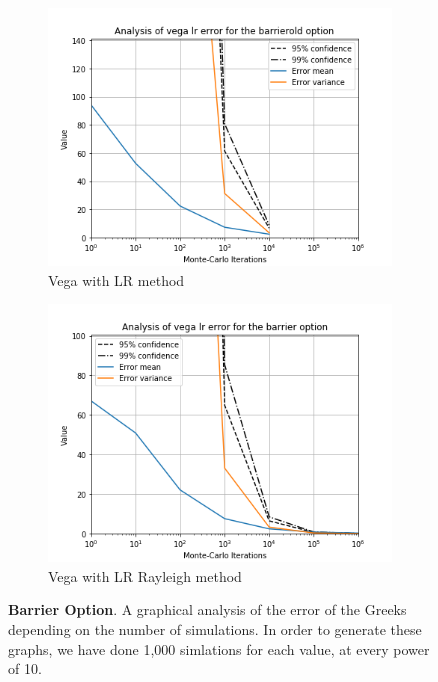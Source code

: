 \documentclass[11pt,a4paper,fleqn]{article}
\begin{document}
\begin{figure}[h!]
      \begin{subfigure}[b]{0.45\textwidth}
          \includegraphics[width=\textwidth]{graphs/barrieroldvegalr.png}
          \caption{Vega with LR method}
      \end{subfigure}
      \begin{subfigure}[b]{0.45\textwidth}
          \includegraphics[width=\textwidth]{graphs/barriervegalr.png}
          \caption{Vega with LR Rayleigh method}
      \end{subfigure}

      \caption{\textbf{Barrier Option}. A graphical analysis of the error of the Greeks depending on the number of simulations. In order to generate these graphs, we have done 1,000 simlations for each value, at every power of 10.}
\end{figure}
\end{document}
